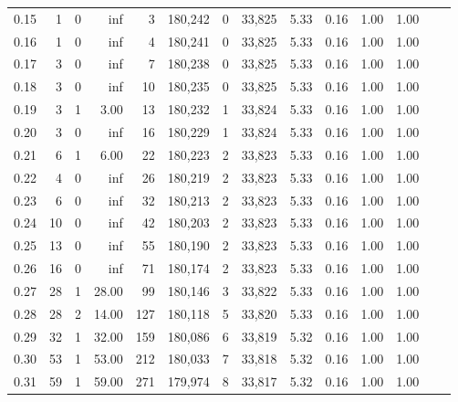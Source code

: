 \begin{tabular}{rrrrrrrrrrrrrr}
0.15 &       1 &      0 &     inf &        3 &  180,242 &       0 &  33,825 &  5.33 &  0.16 &  1.00 &      1.00 \\
0.16 &       1 &      0 &     inf &        4 &  180,241 &       0 &  33,825 &  5.33 &  0.16 &  1.00 &      1.00 \\
0.17 &       3 &      0 &     inf &        7 &  180,238 &       0 &  33,825 &  5.33 &  0.16 &  1.00 &      1.00 \\
0.18 &       3 &      0 &     inf &       10 &  180,235 &       0 &  33,825 &  5.33 &  0.16 &  1.00 &      1.00 \\
0.19 &       3 &      1 &    3.00 &       13 &  180,232 &       1 &  33,824 &  5.33 &  0.16 &  1.00 &      1.00 \\
0.20 &       3 &      0 &     inf &       16 &  180,229 &       1 &  33,824 &  5.33 &  0.16 &  1.00 &      1.00 \\
0.21 &       6 &      1 &    6.00 &       22 &  180,223 &       2 &  33,823 &  5.33 &  0.16 &  1.00 &      1.00 \\
0.22 &       4 &      0 &     inf &       26 &  180,219 &       2 &  33,823 &  5.33 &  0.16 &  1.00 &      1.00 \\
0.23 &       6 &      0 &     inf &       32 &  180,213 &       2 &  33,823 &  5.33 &  0.16 &  1.00 &      1.00 \\
0.24 &      10 &      0 &     inf &       42 &  180,203 &       2 &  33,823 &  5.33 &  0.16 &  1.00 &      1.00 \\
0.25 &      13 &      0 &     inf &       55 &  180,190 &       2 &  33,823 &  5.33 &  0.16 &  1.00 &      1.00 \\
0.26 &      16 &      0 &     inf &       71 &  180,174 &       2 &  33,823 &  5.33 &  0.16 &  1.00 &      1.00 \\
0.27 &      28 &      1 &   28.00 &       99 &  180,146 &       3 &  33,822 &  5.33 &  0.16 &  1.00 &      1.00 \\
0.28 &      28 &      2 &   14.00 &      127 &  180,118 &       5 &  33,820 &  5.33 &  0.16 &  1.00 &      1.00 \\
0.29 &      32 &      1 &   32.00 &      159 &  180,086 &       6 &  33,819 &  5.32 &  0.16 &  1.00 &      1.00 \\
0.30 &      53 &      1 &   53.00 &      212 &  180,033 &       7 &  33,818 &  5.32 &  0.16 &  1.00 &      1.00 \\
0.31 &      59 &      1 &   59.00 &      271 &  179,974 &       8 &  33,817 &  5.32 &  0.16 &  1.00 &      1.00 \\

\end{tabular}

